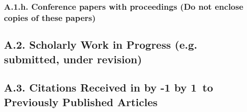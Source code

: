 \documentclass[10pt]{article}
\newcommand{\junk}[1]{}
\newcommand\LastYear{ %
  \advance\year by -1 \the\year\advance\year by 1}
\begin{document}
\junk{
\subsubsection*{A.1.g. Reprints or Translations of Previous or Concurrent Publications}


}


\subsubsection*{A.1.h. Conference papers with proceedings (Do not enclose copies of these papers)}





\subsection*{A.2. Scholarly Work in Progress (e.g. submitted, under revision)}



\subsection*{A.3. Citations Received in \LastYear ~to Previously Published Articles}


\end{document}
